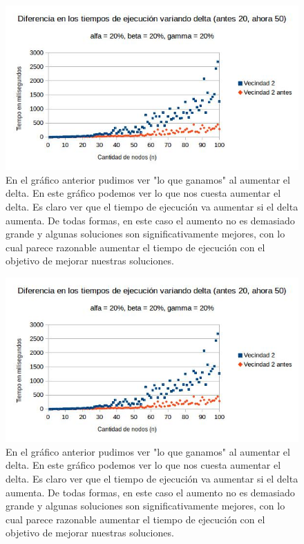 \documentclass[a4paper]{article}
\begin{document}
\begin{figure}[H]
\centering
\includegraphics[scale=0.7]{202020difcom.jpg}\caption{En el gráfico anterior pudimos ver "lo que ganamos" al aumentar el delta. En este gráfico podemos ver lo que nos cuesta aumentar el delta. Es claro ver que el tiempo de ejecución va aumentar si el delta aumenta. De todas formas, en este caso el aumento no es demasiado grande y algunas soluciones son significativamente mejores, con lo cual parece razonable aumentar el tiempo de ejecución con el objetivo de mejorar nuestras soluciones.}
\end{figure}

\begin{figure}[H]
\centering
\includegraphics[scale=0.7]{202020difcom.jpg}\caption{En el gráfico anterior pudimos ver "lo que ganamos" al aumentar el delta. En este gráfico podemos ver lo que nos cuesta aumentar el delta. Es claro ver que el tiempo de ejecución va aumentar si el delta aumenta. De todas formas, en este caso el aumento no es demasiado grande y algunas soluciones son significativamente mejores, con lo cual parece razonable aumentar el tiempo de ejecución con el objetivo de mejorar nuestras soluciones.}
\end{figure}
\end{document}
